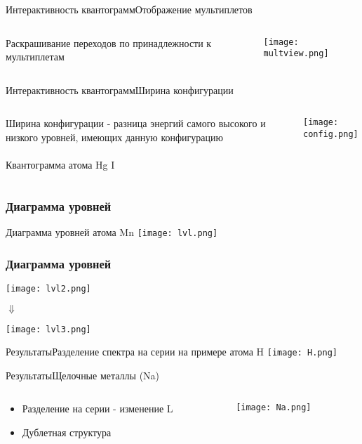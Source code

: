 \documentclass{beamer}
\begin{document}
\begin{frame}{Интерактивность квантограмм}{Отображение мультиплетов}
\begin{columns}
    \begin{column}{0.4\textwidth}
        Раскрашивание переходов по принадлежности к мультиплетам
    \end{column}
    \begin{column}{0.6\textwidth}
    \texttt{[image: multview.png]}
    \end{column}
  \end{columns}
\end{frame}

\begin{frame}{Интерактивность квантограмм}{Ширина конфигурации}
\begin{columns}
    \begin{column}{0.4\textwidth}
        Ширина конфигурации - разница энергий самого высокого и низкого уровней, имеющих данную конфигурацию
        \\~\\
        Квантограмма атома Hg I
    \end{column}
    \begin{column}{0.6\textwidth}
    \texttt{[image: config.png]}
    \end{column}
  \end{columns}
\end{frame}

\begin{frame}
\frametitle{Диаграмма уровней}
Диаграмма уровней атома Mn
    \texttt{[image: lvl.png]}
\end{frame}

\begin{frame}
\frametitle{Диаграмма уровней}
    \texttt{[image: lvl2.png]}\\\begin{center} {$\Downarrow$} \end{center}
    \texttt{[image: lvl3.png]}
\end{frame}

\begin{frame}{Результаты}{Разделение спектра на серии на примере атома H}
    \texttt{[image: H.png]}
\end{frame}
\begin{frame}{Результаты}{Щелочные металлы (Na)}
\begin{columns}
    \begin{column}{0.35\textwidth}
    \begin{itemize}
                \item Разделение на серии - изменение L
                \item Дублетная структура
        \end{itemize}
    \end{column}
    \begin{column}{0.65\textwidth}
    \texttt{[image: Na.png]}
    \end{column}
  \end{columns}
\end{frame}
\end{document}
